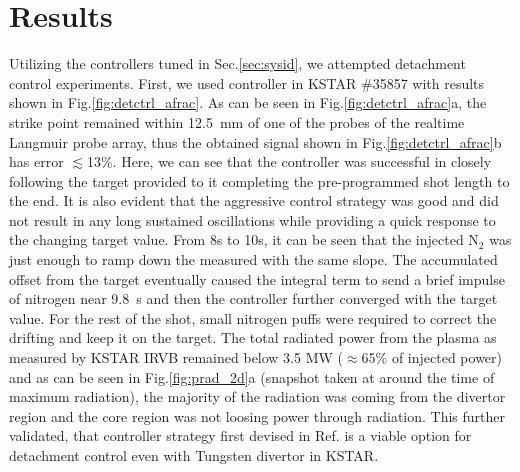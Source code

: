 \section{Results}
\label{sec:results}





Utilizing the controllers tuned in Sec.\ref{sec:sysid}, we attempted detachment control experiments.
First, we used \Afrac controller in KSTAR \#35857 with results shown in Fig.\ref{fig:detctrl_afrac}.
As can be seen in Fig.\ref{fig:detctrl_afrac}a, the strike point remained within 12.5~mm of one of the probes of the realtime Langmuir probe array, thus the obtained \Afrac signal shown in Fig.\ref{fig:detctrl_afrac}b has error $\lesssim$13\%.
Here, we can see that the controller was successful in closely following the target provided to it completing the pre-programmed shot length to the end.
It is also evident that the aggressive control strategy was good and did not result in any long sustained oscillations while providing a quick response to the changing target value.
From 8s to 10s, it can be seen that the injected N$_2$ was just enough to ramp down the measured \Afrac with the same slope.
The accumulated offset from the target eventually caused the integral term to send a brief impulse of nitrogen near 9.8~s and then the controller further converged with the target value.
For the rest of the shot, small nitrogen puffs were required to correct the drifting \Afrac and keep it on the target.
The total radiated power from the plasma as measured by KSTAR \ac{IRVB} remained below 3.5 MW ($\approx$65\% of injected power) and as can be seen in Fig.\ref{fig:prad_2d}a (snapshot taken at around the time of maximum radiation), the majority of the radiation was coming from the divertor region and the core region was not loosing power through radiation.
This further validated, that \Afrac controller strategy first devised in Ref.\cite{Eldon_2022_PPCF} is a viable option for detachment control even with Tungsten divertor in KSTAR.

